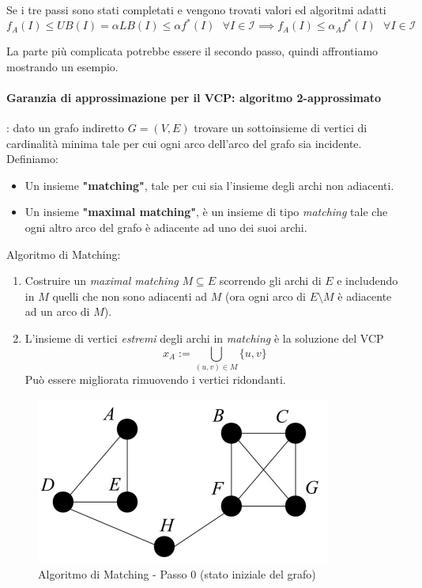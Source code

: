 \documentclass{article}
\begin{document}
Se i tre passi sono stati completati e vengono trovati valori ed algoritmi adatti
$$f_A(I)\leq UB(I)=\alpha LB(I)\leq\alpha f^*(I)\text{   }\forall I\in\mathcal{I}\implies f_A(I)\leq\alpha_A f^*(I)\text{   }\forall I\in\mathcal{I}$$

La parte più complicata potrebbe essere il secondo passo, quindi affrontiamo mostrando un esempio.
\paragraph{Garanzia di approssimazione per il VCP: algoritmo 2-approssimato}: dato un grafo indiretto
$G=(V,E)$ trovare un sottoinsieme di vertici di cardinalità minima tale per cui ogni arco dell'arco
del grafo sia incidente.\\Definiamo:
\begin{itemize}
    \item Un insieme \textbf{"matching"}, tale per cui sia l'insieme degli archi non adiacenti.
    \item Un insieme \textbf{"maximal matching"}, è un insieme di tipo \textit{matching} tale che
          ogni altro arco del grafo è adiacente ad uno dei suoi archi.
\end{itemize}
Algoritmo di Matching:
\begin{enumerate}
    \item Costruire un \textit{maximal matching} $M\subseteq E$ scorrendo gli archi di $E$ e includendo in
          $M$ quelli che non sono adiacenti ad $M$ (ora ogni arco di $E\setminus M$ è adiacente ad un arco di $M$).
    \item L'insieme di vertici \textit{estremi} degli archi in \textit{matching} è la soluzione del VCP
          $$x_A := \bigcup_{(u,v)\in M}\{u,v\}$$ Può essere migliorata rimuovendo i vertici ridondanti.
\end{enumerate}

\begin{figure}[H]
    \centering
    \includegraphics[scale=0.5]{images/matching_0.png}
    \caption{Algoritmo di Matching - Passo 0 (stato iniziale del grafo)}
\end{figure}
\end{document}
